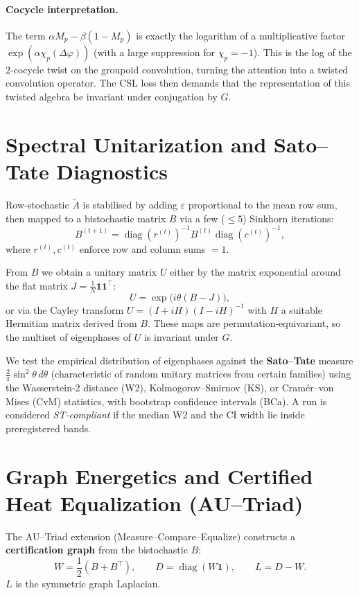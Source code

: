 \documentclass[12pt]{article}
\theoremstyle{plain}
\theoremstyle{definition}
\theoremstyle{remark}
\begin{document}
\paragraph{Cocycle interpretation.} The term $\alpha M_p - \beta(1-M_p)$ is exactly the logarithm of a multiplicative factor $\exp( \alpha \chi_p(\Delta \varphi) )$ (with a large suppression for $\chi_p=-1$). This is the log of the $2$-cocycle twist on the groupoid convolution, turning the attention into a twisted convolution operator. The CSL loss then demands that the representation of this twisted algebra be invariant under conjugation by $G$.

\section{Spectral Unitarization and Sato--Tate Diagnostics}
\label{sec:unitary}

Row‑stochastic $\tilde{A}$ is stabilised by adding $\varepsilon$ proportional to the mean row sum, then mapped to a bistochastic matrix $B$ via a few ($\le 5$) Sinkhorn iterations:
\[
B^{(t+1)} = \operatorname{diag}(r^{(t)})^{-1} B^{(t)} \operatorname{diag}(c^{(t)})^{-1},
\]
where $r^{(t)}, c^{(t)}$ enforce row and column sums $=1$. 

From $B$ we obtain a unitary matrix $U$ either by the matrix exponential around the flat matrix $J = \frac{1}{N}\mathbf{1}\mathbf{1}^\top$:
\[
U = \exp\big(i \theta (B - J)\big),
\]
or via the Cayley transform $U = (I + iH)(I - iH)^{-1}$ with $H$ a suitable Hermitian matrix derived from $B$. These maps are permutation‑equivariant, so the multiset of eigenphases of $U$ is invariant under $G$.

We test the empirical distribution of eigenphases against the \textbf{Sato--Tate} measure $\frac{2}{\pi}\sin^2\theta \, d\theta$ (characteristic of random unitary matrices from certain families) using the Wasserstein‑2 distance (W2), Kolmogorov–Smirnov (KS), or Cramér–von Mises (CvM) statistics, with bootstrap confidence intervals (BCa). A run is considered \emph{ST‑compliant} if the median W2 and the CI width lie inside preregistered bands.

\section{Graph Energetics and Certified Heat Equalization (AU--Triad)}
\label{sec:au}

The AU--Triad extension (Measure–Compare–Equalize) constructs a \textbf{certification graph} from the bistochastic $B$:
\[
W = \frac{1}{2}(B + B^\top), \qquad D = \operatorname{diag}(W\mathbf{1}), \qquad L = D - W.
\]
$L$ is the symmetric graph Laplacian.
\end{document}
